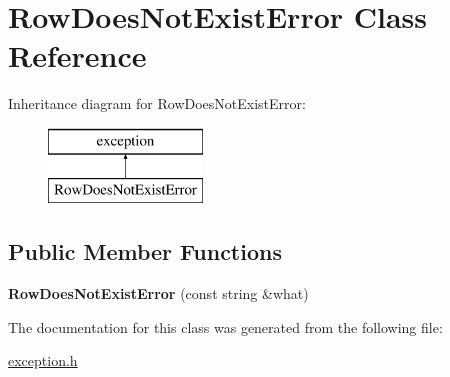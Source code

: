 \hypertarget{class_row_does_not_exist_error}{\section{Row\-Does\-Not\-Exist\-Error Class Reference}
\label{class_row_does_not_exist_error}
}
Inheritance diagram for Row\-Does\-Not\-Exist\-Error\-:\begin{figure}[H]
\begin{center}
\leavevmode
\includegraphics[height=2.000000cm]{class_row_does_not_exist_error}
\end{center}
\end{figure}
\subsection*{Public Member Functions}
\begin{DoxyCompactItemize}
\item 
\hypertarget{class_row_does_not_exist_error_a0b53c63ab8a9220a9a12a44aa3330c36}{{\bfseries Row\-Does\-Not\-Exist\-Error} (const string \&what)}\label{class_row_does_not_exist_error_a0b53c63ab8a9220a9a12a44aa3330c36}

\end{DoxyCompactItemize}


The documentation for this class was generated from the following file\-:\begin{DoxyCompactItemize}
\item 
\hyperlink{exception_8h}{exception.\-h}\end{DoxyCompactItemize}
